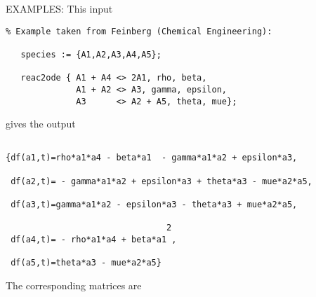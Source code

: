 EXAMPLES:
This input
\begin{verbatim}
% Example taken from Feinberg (Chemical Engineering):

   species := {A1,A2,A3,A4,A5};

   reac2ode { A1 + A4 <> 2A1, rho, beta,
              A1 + A2 <> A3, gamma, epsilon,
              A3      <> A2 + A5, theta, mue};
\end{verbatim}
gives the output
\begin{verbatim}

{df(a1,t)=rho*a1*a4 - beta*a1  - gamma*a1*a2 + epsilon*a3,

 df(a2,t)= - gamma*a1*a2 + epsilon*a3 + theta*a3 - mue*a2*a5,

 df(a3,t)=gamma*a1*a2 - epsilon*a3 - theta*a3 + mue*a2*a5,

                                2
 df(a4,t)= - rho*a1*a4 + beta*a1 ,

 df(a5,t)=theta*a3 - mue*a2*a5}

\end{verbatim}
The corresponding matrices are
